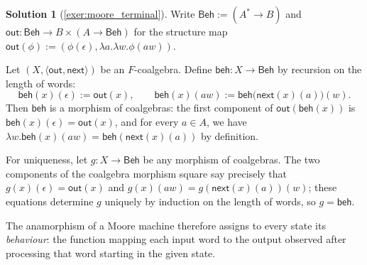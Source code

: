 \documentclass[a4paper,11pt, oneside,titlepage=false]{scrbook}
\theoremstyle{plain}
\theoremstyle{definition}
\newtheorem{solution}[thm]{Solution}
\newcommand{\Out}{\ensuremath{\mathsf{out}}}
\begin{document}
\begin{solution}[\cref{exer:moore_terminal}]\label{sol:moore_terminal}
  Write $\mathsf{Beh} := (A^{*} \to B)$ and
  $\Out : \mathsf{Beh} \to B \times (A \to \mathsf{Beh})$ for the structure map
  $\Out(\phi) := (\phi(\epsilon), \lambda a. \lambda w. \phi(aw))$.

  Let $(X, \langle \mathsf{out}, \mathsf{next}\rangle)$ be an $F$-coalgebra.
  Define $\mathsf{beh} : X \to \mathsf{Beh}$ by recursion on the length of
  words:
  \[
  \mathsf{beh}(x)(\epsilon) := \mathsf{out}(x),
  \qquad
  \mathsf{beh}(x)(aw) := \mathsf{beh}\big(\mathsf{next}(x)(a)\big)(w).
  \]
  Then $\mathsf{beh}$ is a morphism of coalgebras: the first component of
  $\Out(\mathsf{beh}(x))$ is $\mathsf{beh}(x)(\epsilon) = \mathsf{out}(x)$, and
  for every $a \in A$, we have
  $\lambda w. \mathsf{beh}(x)(aw) = \mathsf{beh}(\mathsf{next}(x)(a))$ by
  definition.

  For uniqueness, let $g : X \to \mathsf{Beh}$ be any morphism of coalgebras.
  The two components of the coalgebra morphism square say precisely that
  $g(x)(\epsilon) = \mathsf{out}(x)$ and
  $g(x)(aw) = g(\mathsf{next}(x)(a))(w)$; these equations determine $g$
  uniquely by induction on the length of words, so $g = \mathsf{beh}$.

  The anamorphism of a Moore machine therefore assigns to every state its
  \emph{behaviour}: the function mapping each input word to the output
  observed after processing that word starting in the given state.
\end{solution}
\end{document}
